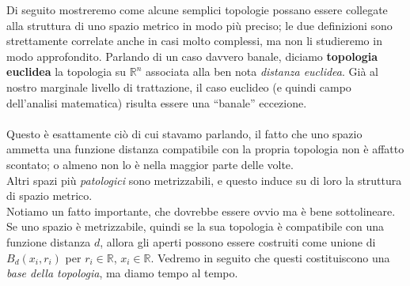 Di seguito mostreremo come alcune semplici topologie possano essere collegate alla struttura di uno spazio metrico in modo più preciso; le due definizioni sono strettamente correlate anche in casi molto complessi, ma non li studieremo in modo approfondito. Parlando di un caso davvero banale, diciamo \textbf{topologia euclidea} la topologia su $\mathbb{R}^n$ associata alla ben nota \textit{distanza euclidea}. Già al nostro marginale livello di trattazione, il caso euclideo (e quindi campo dell'analisi matematica) risulta essere una \enquote{banale} eccezione.
\\ \\ Questo è esattamente ciò di cui stavamo parlando, il fatto che uno spazio ammetta una funzione distanza compatibile con la propria topologia non è affatto scontato; o almeno non lo è nella maggior parte delle volte. \\ Altri spazi più \textit{patologici} sono metrizzabili, e questo induce su di loro la struttura di spazio metrico. \\ Notiamo un fatto importante, che dovrebbe essere ovvio ma è bene sottolineare. Se uno spazio è metrizzabile, quindi se la sua topologia è compatibile con una funzione distanza $d$, allora gli aperti possono essere costruiti come unione di $B_d(x_i,r_i)$ per $r_i \in \mathbb{R}$, $x_i \in \mathbb{R}$. Vedremo in seguito che questi costituiscono una \textit{base della topologia}, ma diamo tempo al tempo.
